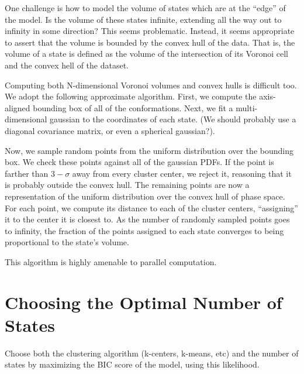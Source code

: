 \documentclass[twocolumn,floatfix,nofootinbib,aps]{revtex4-1}
\begin{document}
One challenge is how to model the volume of states which are at the
``edge'' of the model. Is the volume of these states infinite, extending
all the way out to infinity in some direction? This seems problematic.
Instead, it seems appropriate to assert that the volume is bounded by
the convex hull of the data. That is, the volume of a state is defined
as the volume of the intersection of its Voronoi cell and the convex
hell of the dataset.

Computing both N-dimensional Voronoi volumes and convex hulls is
difficult too. We adopt the following approximate algorithm. First, we
compute the axis-aligned bounding box of all of the conformations. Next,
we fit a multi-dimensional gaussian to the coordinates of each state.
(We should probably use a diagonal covariance matrix, or even a
spherical gaussian?).

Now, we sample random points from the uniform distribution over the
bounding box. We check these points against all of the gaussian PDFs. If
the point is farther than $3-\sigma$ away from every cluster
center, we reject it, reasoning that it is probably outside the convex
hull. The remaining points are now a representation of the uniform
distribution over the convex hull of phase space. For each point, we
compute its distance to each of the cluster centers, ``assigning'' it to
the center it is closest to. As the number of randomly sampled points
goes to infinity, the fraction of the points assigned to each state
converges to being proportional to the state's volume.

This algorithm is highly amenable to parallel computation.

\section{Choosing the Optimal Number of States}

Choose both the clustering algorithm (k-centers, k-means, etc) and the
number of states by maximizing the BIC score of the model, using this
likelihood.


\end{document}
